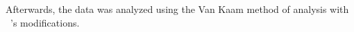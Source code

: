 
Afterwards, the data was analyzed using the Van Kaam method of analysis with \citeauthor{moustakas1994phenomenological}~\cite{moustakas1994phenomenological}'s modifications.
